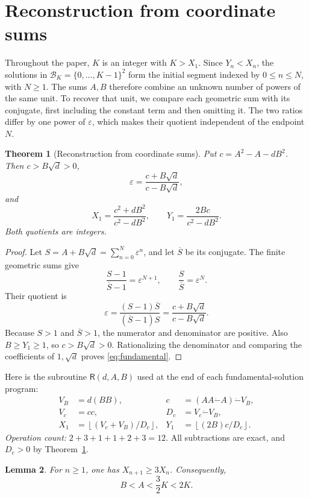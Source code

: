\documentclass[11pt]{article}
\newtheorem{theorem}{Theorem}
\newtheorem{lemma}[theorem]{Lemma}
\theoremstyle{remark}
\newcommand{\eps}{\varepsilon}
\newcommand{\tsub}{\mathbin{\dot{-}}}
\newcommand{\fl}[1]{\left\lfloor #1\right\rfloor}
\newcommand{\Recover}{\mathsf{R}}
\begin{document}
\section{Reconstruction from coordinate sums}\label{sec:reconstruction}

Throughout the paper, $K$ is an integer with $K>X_1$. Since $Y_n<X_n$,
the solutions in $\mathcal B_K=\{0,\ldots,K-1\}^2$ form the initial
segment indexed by $0\le n\le N$, with $N\ge1$.
The sums $A,B$ therefore combine an unknown number of powers of the same
unit. To recover that unit, we compare each geometric sum with its
conjugate, first including the constant term and then omitting it.
The two ratios differ by one power of $\eps$, which makes their quotient
independent of the endpoint $N$.

\begin{theorem}[Reconstruction from coordinate sums]\label{lem:identity}
Put $c=A^2-A-dB^2$. Then $c>B\sqrt d>0$,
\[
  \eps=\frac{c+B\sqrt d}{c-B\sqrt d},
\]
and
\begin{equation}\label{eq:fundamental}
  X_1=\frac{c^2+dB^2}{c^2-dB^2},\qquad
  Y_1=\frac{2Bc}{c^2-dB^2}.
\end{equation}
Both quotients are integers.
\end{theorem}

\begin{proof}
Let $S=A+B\sqrt d=\sum_{n=0}^N\eps^n$, and let $\overline S$ be its
conjugate. The finite geometric sums give
\[
  \frac{S-1}{\overline S-1}=\eps^{N+1},\qquad
  \frac S{\overline S}=\eps^N.
\]
Their quotient is
\[
  \eps=\frac{(S-1)\overline S}{(\overline S-1)S}
       =\frac{c+B\sqrt d}{c-B\sqrt d}.
\]
Because $S>1$ and $\overline S>1$, the numerator and denominator are
positive. Also $B\ge Y_1\ge1$, so $c>B\sqrt d>0$.
Rationalizing the denominator and comparing the coefficients of
$1,\sqrt d$ proves \eqref{eq:fundamental}.
\end{proof}

Here is the subroutine $\Recover(d,A,B)$ used at the end of each
fundamental-solution program:
\begin{align*}
  V_B&=d(BB),& c&=(AA\tsub A)\tsub V_B,\\
  V_c&=cc,& D_c&=V_c\tsub V_B,\\
  X_1&=\fl{(V_c+V_B)/D_c},&
  Y_1&=\fl{(2B)c/D_c}.
\end{align*}
\emph{Operation count:} $2+3+1+1+2+3=12$.
All subtractions are exact, and $D_c>0$ by Theorem~\ref{lem:identity}.

\begin{lemma}\label{lem:sum-bound}
For $n\ge1$, one has $X_{n+1}\ge3X_n$. Consequently,
\[
  B<A<\frac32K<2K.
\]
\end{lemma}
\end{document}
